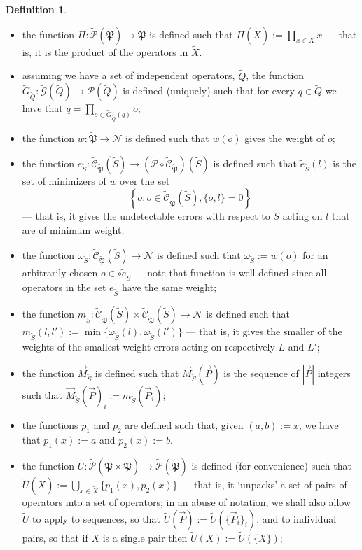 \documentclass[12pt]{amsbook}
\theoremstyle{plain}
\theoremstyle{definition}
\newtheorem{definition}{Definition}
\theoremstyle{remark}
\newcommand{\lst}{\vec}
\newcommand{\set}{\tilde}
\newcommand{\genfun}{\tilde{\mathcal{G}}}
\newcommand{\pauligroup}{{\set{\mathfrak{P}}}}
\newcommand{\powerset}{\set{\mathcal{P}}}
\newcommand{\centralizer}{\set{\mathcal{C}}}
\newcommand{\om}{\omega}
\newcommand{\paren}[1]{\left(#1\right)}
\begin{document}
\begin{definition}
$\quad$

\begin{itemize}
\item the function $\Pi:\powerset(\pauligroup)\to\pauligroup$ is defined such that $\Pi(\set X):=\prod_{x\in \set X} x$ --- that is, it is the product of the operators in $\set X$.
\item assuming we have a set of independent operators, $\set Q$, the function $\set G_{\set Q}:\genfun(\set Q)\to\powerset(\set Q)$ is defined (uniquely) such that for every $q\in\set Q$ we have that $q=\prod_{o\in\set G_{\set Q}(q)} o$;
\item the function $w:\pauligroup\to \mathscr{N}$ is defined such that $w(o)$ gives the weight of $o$;
\item the function $e_{\set S}:\centralizer_\pauligroup\paren{\set S}\to \paren{\powerset\circ\centralizer_\pauligroup}\paren{\set S}$ is defined such that $\set e_{\set S}(l)$ is the set of minimizers of $w$ over the set $$\left\{o: o\in \centralizer_\pauligroup\paren{\set S}, \{o,l\}=0\right\}$$ --- that is, it gives the undetectable errors with respect to $\set S$ acting on $l$ that are of minimum weight;
\item the function $\om_{\set S}:\centralizer_\pauligroup\paren{\set S}\to\mathscr{N}$ is defined such that $\om_{\set S}:=w(o)$ for an arbitrarily chosen $o\in\circ \set e_{\set S}$ --- note that function is well-defined since all operators in the set $\set e_{\set S}$ have the same weight;
\item the function $m_{\set S}:\centralizer_\pauligroup\paren{\set S}\times \centralizer_\pauligroup\paren{\set S} \to \mathscr{N}$ is defined such that $m_{\set S}(l,l'):=\min \{\om_{\set S}(l),\om_{\set S}(l')\}$ --- that is, it gives the smaller of the weights of the smallest weight errors acting on respectively $\set L$ and $\set L'$;
\item the function $\lst M_{\set S}$ is defined such that $\lst M_{\set S}\paren{\lst P}$ is the sequence of $|\lst P|$ integers such that $\lst M_{\set S}\paren{\lst P}_i := m_{\set S}\paren{\lst P_i}$;
\item the functions $p_1$ and $p_2$ are defined such that, given $(a,b):=x$, we have that $p_1(x):=a$ and $p_2(x):=b$.
\item the function $\set U:\powerset(\pauligroup\times\pauligroup)\to\powerset(\pauligroup)$ is defined (for convenience) such that $\set U\paren{\set X}:=\bigcup_{x\in\set X} \{p_1(x),p_2(x)\}$ --- that is, it `unpacks' a set of pairs of operators into a set of operators;  in an abuse of notation, we shall also allow $\set U$ to apply to sequences, so that $\set U(\lst P) := \set U\paren{\{\lst P_i\}_i}$, and to individual pairs, so that if $X$ is a single pair then $\set U(X) := \set U(\{X\})$;

\end{itemize}
\end{definition}
\end{document}
